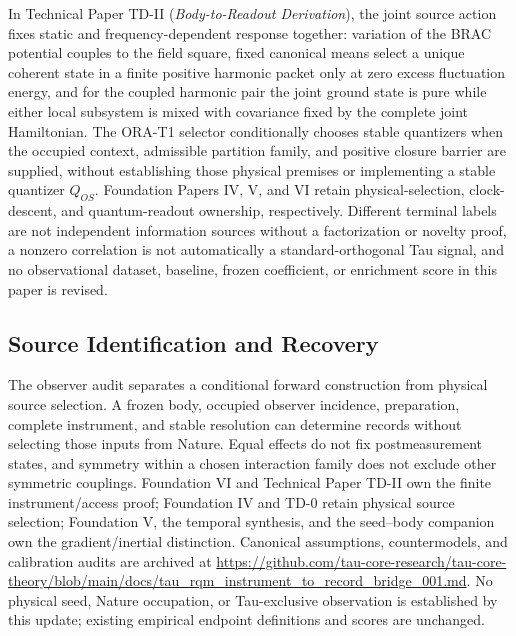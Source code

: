 \documentclass[11pt,a4paper]{article}
\begin{document}
In Technical Paper TD-II (\emph{Body-to-Readout Derivation}), the joint source
action fixes static and frequency-dependent response together: variation of the
BRAC potential couples to the field square, fixed canonical means select a
unique coherent state in a finite positive harmonic packet only at zero excess
fluctuation energy, and for the coupled harmonic pair the joint ground state is
pure while either local subsystem is mixed with covariance fixed by the
complete joint Hamiltonian. The ORA-T1 selector conditionally chooses stable
quantizers when the occupied context, admissible partition family, and positive
closure barrier are supplied, without establishing those physical premises or
implementing a stable quantizer $Q_{OS}$. Foundation Papers IV, V, and VI
retain physical-selection, clock-descent, and quantum-readout ownership,
respectively. Different terminal labels are not independent information sources
without a factorization or novelty proof, a nonzero correlation is not
automatically a standard-orthogonal Tau signal, and no observational dataset,
baseline, frozen coefficient, or enrichment score in this paper is revised.

\subsection{Source Identification and Recovery}
The observer audit separates a conditional forward construction from physical source selection. A frozen body, occupied observer incidence, preparation, complete instrument, and stable resolution can determine records without selecting those inputs from Nature. Equal effects do not fix postmeasurement states, and symmetry within a chosen interaction family does not exclude other symmetric couplings. Foundation VI and Technical Paper TD-II own the finite instrument/access proof; Foundation IV and TD-0 retain physical source selection; Foundation V, the temporal synthesis, and the seed--body companion own the gradient/inertial distinction. Canonical assumptions, countermodels, and calibration audits are archived at \url{https://github.com/tau-core-research/tau-core-theory/blob/main/docs/tau_rqm_instrument_to_record_bridge_001.md}. No physical seed, Nature occupation, or Tau-exclusive observation is established by this update; existing empirical endpoint definitions and scores are unchanged.

\end{document}
